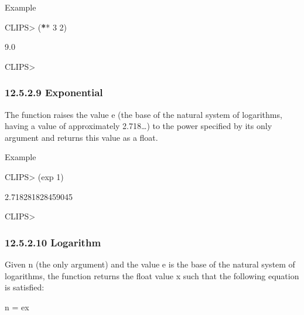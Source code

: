 \documentclass[letterpaper,10pt,english]{sphinxmanual}
\begin{document}

\begin{sphinxVerbatim}[commandchars=\\\{\}]
\PYGZbs{}  
\end{sphinxVerbatim}

Example

CLIPS\textgreater{} ({\color{red}\bfseries{}*}* 3 2)

9.0

CLIPS\textgreater{}


\subsubsection{12.5.2.9 Exponential}
\label{\detokenize{actions:exponential}}
The  function raises the value e (the base of the natural system
of logarithms, having a value of approximately 2.718…) to the power
specified by its only argument and returns this value as a float.


\begin{sphinxVerbatim}[commandchars=\\\{\}]
 
\end{sphinxVerbatim}

Example

CLIPS\textgreater{} (exp 1)

2.718281828459045

CLIPS\textgreater{}


\subsubsection{12.5.2.10 Logarithm}
\label{\detokenize{actions:logarithm}}
Given n (the only argument) and the value e is the base of the natural
system of logarithms, the  function returns the float value x
such that the following equation is satisfied:

n = ex


\begin{sphinxVerbatim}[commandchars=\\\{\}]
 
\end{sphinxVerbatim}
\end{document}
